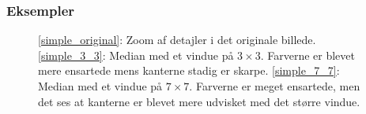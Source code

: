 {\subsubsection*{Eksempler}
\begin{figure}[!h]
    \centering
    \hspace{1em}
    \hspace{1em}
    \caption[]{\ref{simple_original}: Zoom af detajler i det originale
    billede. \ref{simple_3_3}: Median med et vindue på $3\times{}3$.
    Farverne er blevet mere ensartede mens kanterne stadig er skarpe.
    \ref{simple_7_7}: Median med et vindue på $7\times{}7$. Farverne er
    meget ensartede, men det ses at kanterne er blevet mere udvisket med
    det større vindue.}
    \label{simple_metode}
\end{figure}

}
